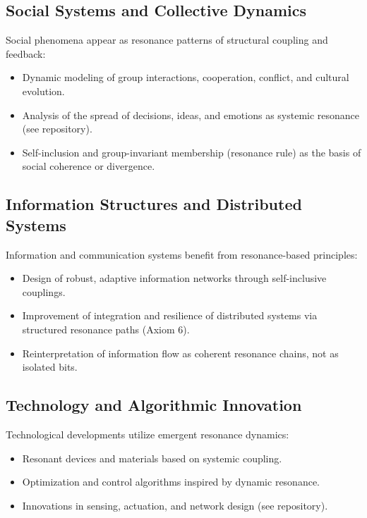 \documentclass[12pt]{iopart}
\begin{document}
\subsection{Social Systems and Collective Dynamics}

Social phenomena appear as resonance patterns of structural coupling and feedback:
\begin{itemize}
	\item Dynamic modeling of group interactions, cooperation, conflict, and cultural evolution.
	\item Analysis of the spread of decisions, ideas, and emotions as systemic resonance (see repository).
	\item Self-inclusion and group-invariant membership (resonance rule) as the basis of social coherence or divergence.
\end{itemize}

\subsection{Information Structures and Distributed Systems}

Information and communication systems benefit from resonance-based principles:
\begin{itemize}
	\item Design of robust, adaptive information networks through self-inclusive couplings.
	\item Improvement of integration and resilience of distributed systems via structured resonance paths (Axiom 6).
	\item Reinterpretation of information flow as coherent resonance chains, not as isolated bits.
\end{itemize}

\subsection{Technology and Algorithmic Innovation}

Technological developments utilize emergent resonance dynamics:
\begin{itemize}
	\item Resonant devices and materials based on systemic coupling.
	\item Optimization and control algorithms inspired by dynamic resonance.
	\item Innovations in sensing, actuation, and network design (see repository).
\end{itemize}
\end{document}
